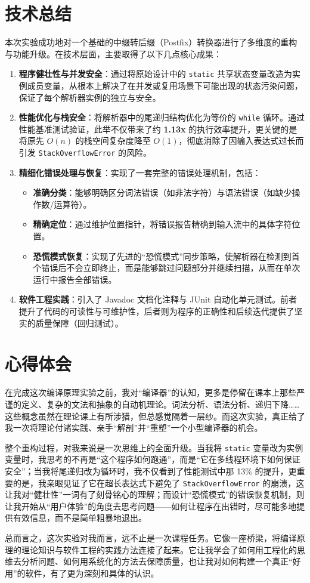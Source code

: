 \section{技术总结}
本次实验成功地对一个基础的中缀转后缀（Postfix）转换器进行了多维度的重构与功能升级。在技术层面，主要取得了以下几点核心成果：
\begin{enumerate}
    \item \textbf{程序健壮性与并发安全}：通过将原始设计中的 \texttt{static} 共享状态变量改造为实例成员变量，从根本上解决了在并发或复用场景下可能出现的状态污染问题，保证了每个解析器实例的独立与安全。
    \item \textbf{性能优化与栈安全}：将解析器中的尾递归结构优化为等价的 \texttt{while} 循环。通过性能基准测试验证，此举不仅带来了约 \textbf{1.13x} 的执行效率提升，更关键的是将原先 $O(n)$ 的栈空间复杂度降至 $O(1)$，彻底消除了因输入表达式过长而引发 \texttt{StackOverflowError} 的风险。
    \item \textbf{精细化错误处理与恢复}：实现了一套完整的错误处理机制，包括：
    \begin{itemize}
        \item \textbf{准确分类}：能够明确区分词法错误（如非法字符）与语法错误（如缺少操作数/运算符）。
        \item \textbf{精确定位}：通过维护位置指针，将错误报告精确到输入流中的具体字符位置。
        \item \textbf{恐慌模式恢复}：实现了先进的“恐慌模式”同步策略，使解析器在检测到首个错误后不会立即终止，而是能够跳过问题部分并继续扫描，从而在单次运行中报告全部错误。
    \end{itemize}
    \item \textbf{软件工程实践}：引入了 Javadoc 文档化注释与 JUnit 自动化单元测试。前者提升了代码的可读性与可维护性，后者则为程序的正确性和后续迭代提供了坚实的质量保障（回归测试）。
\end{enumerate}

\section{心得体会}
在完成这次编译原理实验之前，我对“编译器”的认知，更多是停留在课本上那些严谨的定义、复杂的文法和抽象的自动机理论。词法分析、语法分析、递归下降……这些概念虽然在理论课上有所涉猎，但总感觉隔着一层纱。而这次实验，真正给了我一次将理论付诸实践、亲手“解剖”并“重塑”一个小型编译器的机会。

整个重构过程，对我来说是一次思维上的全面升级。当我将 \texttt{static} 变量改为实例变量时，我思考的不再是“这个程序如何跑通”，而是“它在多线程环境下如何保证安全”；当我将尾递归改为循环时，我不仅看到了性能测试中那 13\% 的提升，更重要的是，我亲眼见证了它在超长表达式下避免了 \texttt{StackOverflowError} 的崩溃，这让我对“健壮性”一词有了刻骨铭心的理解；而设计“恐慌模式”的错误恢复机制，则让我开始从“用户体验”的角度去思考问题——如何让程序在出错时，尽可能多地提供有效信息，而不是简单粗暴地退出。

总而言之，这次实验对我而言，远不止是一次课程任务。它像一座桥梁，将编译原理的理论知识与软件工程的实践方法连接了起来。它让我学会了如何用工程化的思维去分析问题、如何用系统化的方法去保障质量，也让我对如何构建一个真正“好用”的软件，有了更为深刻和具体的认识。